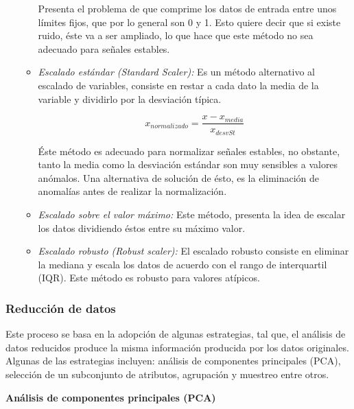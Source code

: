 \begin{itemize}
\begin{itemize}
Presenta el problema de que comprime los datos de entrada entre unos límites fijos, que por lo general son 0 y 1. Esto quiere decir que si existe ruido, éste va a ser ampliado, lo que hace que este m\'{e}todo no sea adecuado para señales estables.

\item \textit{Escalado est\'{a}ndar (Standard Scaler): }Es un m\'{e}todo alternativo al escalado de variables, consiste en restar a cada dato la media de la variable y dividirlo por la desviaci\'{o}n t\'{i}pica.

\begin{equation}
x_{normalizado} = \frac{x - x_{media}}{x_{desvSt}}
\end{equation}

\'{E}ste m\'{e}todo es adecuado para normalizar se\~{n}ales estables, no obstante, tanto la media como la desviaci\'{o}n est\'{a}ndar son muy sensibles a valores an\'{o}malos. Una alternativa de soluci\'{o}n de \'{e}sto, es la eliminaci\'{o}n de anomal\'{i}as antes de realizar la normalizaci\'{o}n.

\item \textit{Escalado sobre el valor m\'{a}ximo: }Este m\'{e}todo, presenta la idea de escalar los datos dividiendo \'{e}stos entre su m\'{a}ximo valor.

\item \textit{Escalado robusto (Robust scaler): }El escalado robusto consiste en eliminar la mediana y escala los datos de acuerdo con el rango de interquartil (IQR). Este m\'{e}todo es robusto para valores at\'{i}picos.

\end{itemize}

\end{itemize}

\subsubsection{Reducci\'{o}n de datos}

Este proceso se basa en la adopci\'{o}n de algunas estrategias, tal que, el an\'{a}lisis de datos reducidos produce la misma informaci\'{o}n producida por los datos originales. Algunas de las estrategias incluyen: an\'{a}lisis de componentes principales (PCA), selecci\'{o}n de un subconjunto de atributos, agrupaci\'{o}n y muestreo entre otros.

\vspace{5mm} %

\textbf{An\'{a}lisis de componentes principales (PCA)}

